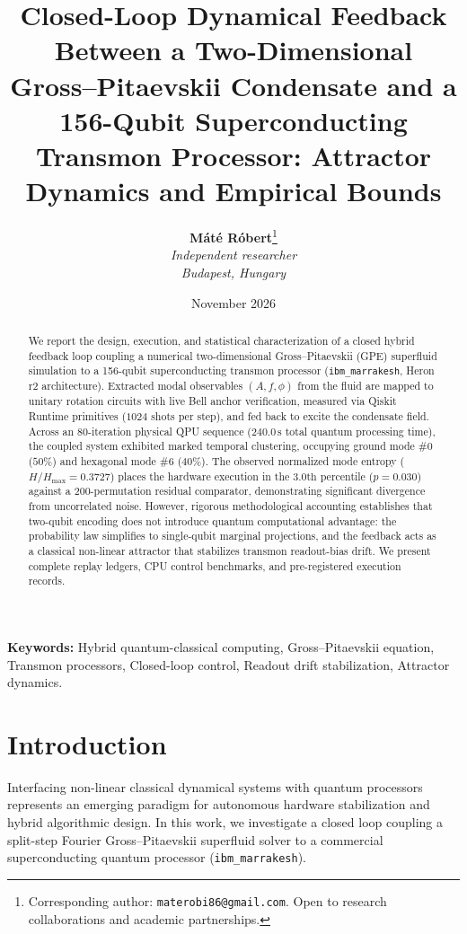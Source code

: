 \documentclass[11pt,a4paper]{article}
\title{\textbf{Closed-Loop Dynamical Feedback Between a Two-Dimensional Gross--Pitaevskii Condensate and a 156-Qubit Superconducting Transmon Processor: Attractor Dynamics and Empirical Bounds}}
\author{
  \textbf{M\'at\'e R\'obert}\thanks{Corresponding author: \texttt{materobi86@gmail.com}. Open to research collaborations and academic partnerships.}\\
  \textit{Independent researcher}\\
  \textit{Budapest, Hungary}
}
\date{November 2026}
\begin{document}
\maketitle

\begin{abstract}
We report the design, execution, and statistical characterization of a closed hybrid feedback loop coupling a numerical two-dimensional Gross--Pitaevskii (GPE) superfluid simulation to a 156-qubit superconducting transmon processor (\texttt{ibm\_marrakesh}, Heron r2 architecture). Extracted modal observables $(A, f, \phi)$ from the fluid are mapped to unitary rotation circuits with live Bell anchor verification, measured via Qiskit Runtime primitives ($1024$ shots per step), and fed back to excite the condensate field. Across an 80-iteration physical QPU sequence ($240.0\,\text{s}$ total quantum processing time), the coupled system exhibited marked temporal clustering, occupying ground mode \#0 ($50\%$) and hexagonal mode \#6 ($40\%$). The observed normalized mode entropy ($H/H_{\text{max}} = 0.3727$) places the hardware execution in the $3.0\text{th}$ percentile ($p = 0.030$) against a $200$-permutation residual comparator, demonstrating significant divergence from uncorrelated noise. However, rigorous methodological accounting establishes that two-qubit encoding does not introduce quantum computational advantage: the probability law simplifies to single-qubit marginal projections, and the feedback acts as a classical non-linear attractor that stabilizes transmon readout-bias drift. We present complete replay ledgers, CPU control benchmarks, and pre-registered execution records.
\end{abstract}

\vspace{1em}
\noindent \textbf{Keywords:} Hybrid quantum-classical computing, Gross--Pitaevskii equation, Transmon processors, Closed-loop control, Readout drift stabilization, Attractor dynamics.

\section{Introduction}
Interfacing non-linear classical dynamical systems with quantum processors represents an emerging paradigm for autonomous hardware stabilization and hybrid algorithmic design. In this work, we investigate a closed loop coupling a split-step Fourier Gross--Pitaevskii superfluid solver to a commercial superconducting quantum processor (\texttt{ibm\_marrakesh}).
\end{document}
